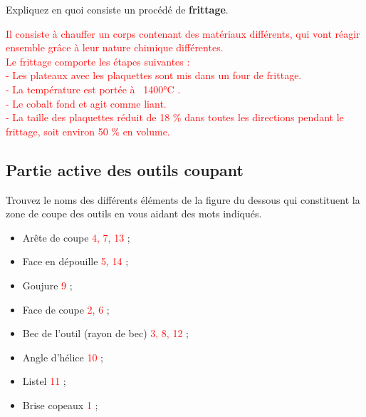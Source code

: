 \documentclass[12pt,a4paper]{article} %
\begin{document}
\begin{exo} Expliquez en quoi consiste un procédé de \textbf{frittage}.\end{exo}

\textcolor{red}{Il consiste à chauffer un corps contenant des matériaux différents, qui vont réagir ensemble grâce à leur nature chimique différentes.\\
Le frittage comporte les étapes suivantes : \\
- Les plateaux avec les plaquettes sont mis dans un four de frittage. \\
- La température est portée à ~1400°C . \\
- Le cobalt fond et agit comme liant. \\
- La taille des plaquettes réduit de 18 \% dans toutes les directions pendant le frittage, soit environ 50 \% en volume.}


\subsection{Partie active des outils coupant}

\begin{exo} Trouvez le noms des différents éléments de la figure du dessous qui constituent la zone de coupe des outils en vous aidant des mots indiqués.\end{exo}

\begin{minipage}{.55\linewidth}
\begin{itemize}
    \item Arête de coupe \textcolor{red}{4, 7, 13} ;
    \item Face en dépouille \textcolor{red}{5, 14} ;
    \item Goujure \textcolor{red}{9} ;
    \item Face de coupe \textcolor{red}{2, 6} ;
\end{itemize} 
\end{minipage}
\begin{minipage}{.44\linewidth}
\begin{itemize}
    \item Bec de l'outil (rayon de bec) \textcolor{red}{3, 8, 12}  ;
    \item Angle d'hélice \textcolor{red}{10} ;
    \item Listel \textcolor{red}{11} ;
    \item Brise copeaux \textcolor{red}{1} ;
\end{itemize} 
\end{minipage}
\end{document}
